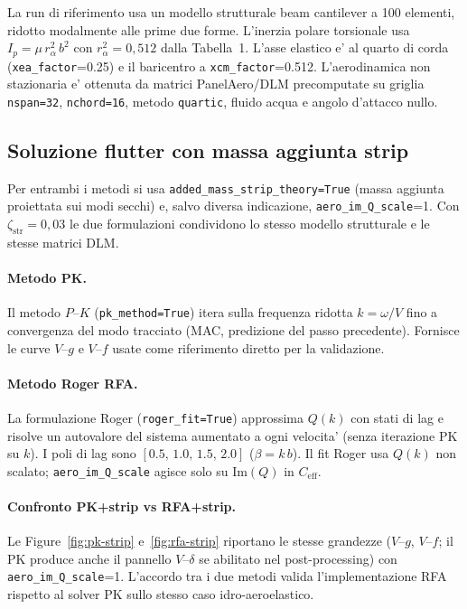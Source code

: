 \documentclass[11pt,a4paper]{article}
\begin{document}
La run di riferimento usa un modello strutturale beam cantilever a 100 elementi, ridotto
modalmente alle prime due forme. L'inerzia polare torsionale usa $I_p=\mu\,r_\alpha^2\,b^2$
con $r_\alpha^2=0{,}512$ dalla Tabella~1. L'asse elastico e' al quarto di corda
(\texttt{xea\_factor}=0.25) e il baricentro a \texttt{xcm\_factor}=0.512.
L'aerodinamica non stazionaria e' ottenuta da matrici PanelAero/DLM precomputate su griglia
\texttt{nspan=32}, \texttt{nchord=16}, metodo \texttt{quartic}, fluido acqua e angolo
d'attacco nullo.

\subsection{Soluzione flutter con massa aggiunta strip}

Per entrambi i metodi si usa \texttt{added\_mass\_strip\_theory=True} (massa aggiunta
proiettata sui modi secchi) e, salvo diversa indicazione,
\texttt{aero\_im\_Q\_scale}=1.
Con $\zeta_\mathrm{str}=0{,}03$ le due formulazioni condividono lo stesso modello
strutturale e le stesse matrici DLM.

\paragraph{Metodo PK.}
Il metodo $P$--$K$ (\texttt{pk\_method=True}) itera sulla frequenza ridotta $k=\omega/V$
fino a convergenza del modo tracciato (MAC, predizione del passo precedente).
Fornisce le curve $V$--$g$ e $V$--$f$ usate come riferimento diretto per la validazione.

\paragraph{Metodo Roger RFA.}
La formulazione Roger (\texttt{roger\_fit=True}) approssima $Q(k)$ con stati di lag e
risolve un autovalore del sistema aumentato a ogni velocita' (senza iterazione PK su $k$).
I poli di lag sono $[0.5,\,1.0,\,1.5,\,2.0]$ ($\beta=k\,b$). Il fit Roger usa $Q(k)$ non
scalato; \texttt{aero\_im\_Q\_scale} agisce solo su $\mathrm{Im}(Q)$ in $C_\mathrm{eff}$.

\paragraph{Confronto PK+strip vs RFA+strip.}
Le Figure~\ref{fig:pk-strip} e~\ref{fig:rfa-strip} riportano le stesse grandezze
($V$--$g$, $V$--$f$; il PK produce anche il pannello $V$--$\delta$ se abilitato nel post-processing)
con \texttt{aero\_im\_Q\_scale}=1. L'accordo tra i due metodi valida l'implementazione RFA
rispetto al solver PK sullo stesso caso idro-aeroelastico.
\end{document}
